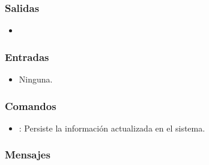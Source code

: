 
\subsubsection{Salidas}
	\begin{itemize} 
		\item {}
	\end{itemize}

\subsubsection{Entradas}
\begin{itemize}
	\item Ninguna.
\end{itemize}

\subsubsection{Comandos}
\begin{itemize}
	\item {}: Persiste la información actualizada en el sistema.
\end{itemize}

\subsubsection{Mensajes}
\begin{Citemize}
	\item {}
\end{Citemize}